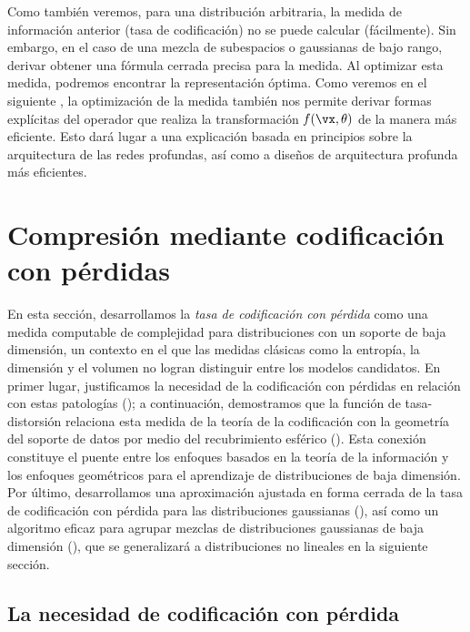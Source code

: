 \documentclass[../../book-main.tex]{subfiles}
\begin{document}
Como también veremos, para una distribución arbitraria, la medida de información anterior
(tasa de codificación) no se puede calcular (fácilmente). Sin embargo,
en el caso de una mezcla de subespacios o gaussianas de bajo rango, derivar obtener una
fórmula cerrada precisa para la medida. Al optimizar esta medida,
podremos encontrar la representación óptima. Como veremos en
el siguiente , la optimización de la medida también nos permite
derivar formas explícitas del operador que realiza la
transformación $f(\vx,\theta)$ de la manera más eficiente. Esto
dará lugar a una explicación basada en principios sobre la arquitectura de las redes profundas,
así como a diseños de arquitectura profunda más eficientes.

\section{Compresión mediante codificación con pérdidas}
\label{sec:lossy_compression}

En esta sección, desarrollamos la \textit{tasa de codificación con pérdida}
como una medida computable de complejidad para distribuciones con 
un soporte de baja dimensión, un contexto en el que las medidas clásicas como
la entropía, la dimensión y el volumen no logran distinguir entre los modelos
candidatos. En primer lugar, justificamos la necesidad de la codificación con 
pérdidas en relación con estas patologías (); a continuación, 
demostramos que la función de tasa-distorsión relaciona esta medida de la teoría 
de la codificación con la geometría del soporte de datos
por medio del recubrimiento esférico ().
Esta conexión constituye el puente entre los enfoques basados en la teoría de la información y los enfoques geométricos
para el aprendizaje de distribuciones de baja dimensión. Por último, desarrollamos
una aproximación ajustada en forma cerrada de la tasa de codificación con pérdida para las distribuciones gaussianas
(), así como un algoritmo eficaz para agrupar mezclas de
distribuciones gaussianas de baja dimensión (), que se
generalizará a distribuciones no lineales en la siguiente sección.

\subsection{La necesidad de codificación con pérdida}
\label{sub:rate-dist}
\end{document}
